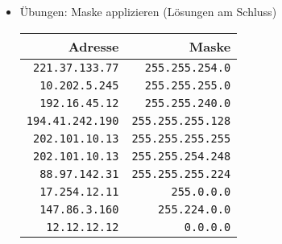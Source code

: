 \documentclass[a4paper,german]{scrartcl}
\begin{document}
\begin{itemize}
\begin{itemize}
   \item \"Ubungen: Maske applizieren (L\"osungen am Schluss)
      \begin{center}
        \begin{tabular}{rr}
          Adresse & Maske \\
          \hline
          \texttt{221.37.133.77} & \texttt{255.255.254.0} \\
          \texttt{10.202.5.245} & \texttt{255.255.255.0} \\
          \texttt{192.16.45.12} & \texttt{255.255.240.0} \\
          \texttt{194.41.242.190} & \texttt{255.255.255.128} \\
          \texttt{202.101.10.13} & \texttt{255.255.255.255} \\
          \texttt{202.101.10.13} & \texttt{255.255.254.248} \\
          \texttt{88.97.142.31} & \texttt{255.255.255.224} \\
          \texttt{17.254.12.11} & \texttt{255.0.0.0} \\
          \texttt{147.86.3.160} & \texttt{255.224.0.0} \\
          \texttt{12.12.12.12} & \texttt{0.0.0.0} \\
        \end{tabular}
      \end{center}
     

    \end{itemize}
\end{itemize}

\clearpage
\end{document}
